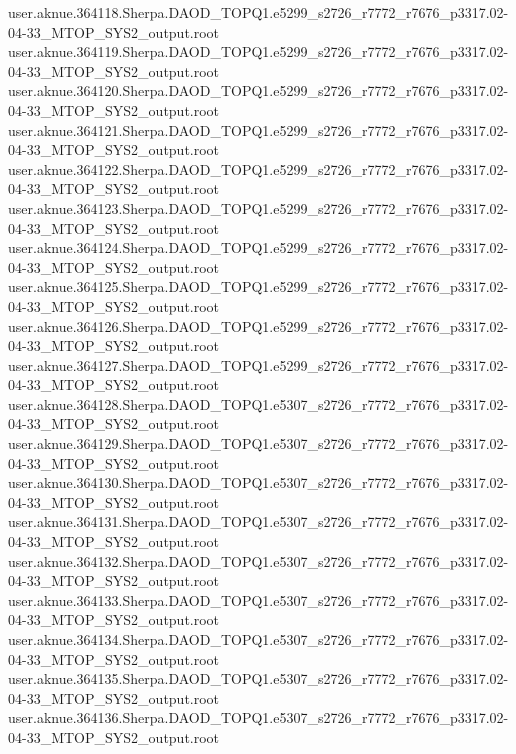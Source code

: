 {user.aknue.364118.Sherpa.DAOD_TOPQ1.e5299_s2726_r7772_r7676_p3317.02-04-33_MTOP_SYS2_output.root\\
user.aknue.364119.Sherpa.DAOD_TOPQ1.e5299_s2726_r7772_r7676_p3317.02-04-33_MTOP_SYS2_output.root\\
user.aknue.364120.Sherpa.DAOD_TOPQ1.e5299_s2726_r7772_r7676_p3317.02-04-33_MTOP_SYS2_output.root\\
user.aknue.364121.Sherpa.DAOD_TOPQ1.e5299_s2726_r7772_r7676_p3317.02-04-33_MTOP_SYS2_output.root\\
user.aknue.364122.Sherpa.DAOD_TOPQ1.e5299_s2726_r7772_r7676_p3317.02-04-33_MTOP_SYS2_output.root\\
user.aknue.364123.Sherpa.DAOD_TOPQ1.e5299_s2726_r7772_r7676_p3317.02-04-33_MTOP_SYS2_output.root\\
user.aknue.364124.Sherpa.DAOD_TOPQ1.e5299_s2726_r7772_r7676_p3317.02-04-33_MTOP_SYS2_output.root\\
user.aknue.364125.Sherpa.DAOD_TOPQ1.e5299_s2726_r7772_r7676_p3317.02-04-33_MTOP_SYS2_output.root\\
user.aknue.364126.Sherpa.DAOD_TOPQ1.e5299_s2726_r7772_r7676_p3317.02-04-33_MTOP_SYS2_output.root\\
user.aknue.364127.Sherpa.DAOD_TOPQ1.e5299_s2726_r7772_r7676_p3317.02-04-33_MTOP_SYS2_output.root\\
user.aknue.364128.Sherpa.DAOD_TOPQ1.e5307_s2726_r7772_r7676_p3317.02-04-33_MTOP_SYS2_output.root\\
user.aknue.364129.Sherpa.DAOD_TOPQ1.e5307_s2726_r7772_r7676_p3317.02-04-33_MTOP_SYS2_output.root\\
user.aknue.364130.Sherpa.DAOD_TOPQ1.e5307_s2726_r7772_r7676_p3317.02-04-33_MTOP_SYS2_output.root\\
user.aknue.364131.Sherpa.DAOD_TOPQ1.e5307_s2726_r7772_r7676_p3317.02-04-33_MTOP_SYS2_output.root\\
user.aknue.364132.Sherpa.DAOD_TOPQ1.e5307_s2726_r7772_r7676_p3317.02-04-33_MTOP_SYS2_output.root\\
user.aknue.364133.Sherpa.DAOD_TOPQ1.e5307_s2726_r7772_r7676_p3317.02-04-33_MTOP_SYS2_output.root\\
user.aknue.364134.Sherpa.DAOD_TOPQ1.e5307_s2726_r7772_r7676_p3317.02-04-33_MTOP_SYS2_output.root\\
user.aknue.364135.Sherpa.DAOD_TOPQ1.e5307_s2726_r7772_r7676_p3317.02-04-33_MTOP_SYS2_output.root\\
user.aknue.364136.Sherpa.DAOD_TOPQ1.e5307_s2726_r7772_r7676_p3317.02-04-33_MTOP_SYS2_output.root\\
}
